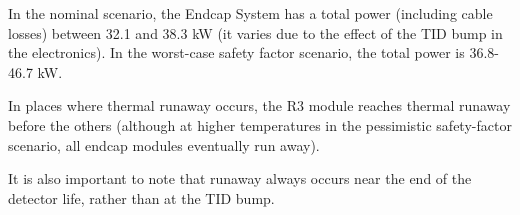 In the nominal scenario, the Endcap System has a total power (including cable losses) between 32.1
and 38.3 kW (it varies due to the effect of the TID bump in the electronics).
In the worst-case safety factor scenario, the total power is 36.8-46.7 kW.

In places where thermal runaway occurs, the R3 module reaches thermal runaway before the others
(although at higher temperatures in the pessimistic safety-factor scenario, all endcap modules
eventually run away).

It is also important to note that runaway always occurs near the end of the detector life, rather than
at the TID bump.

\let\arraystretcha\arraystretch
\renewcommand\arraystretch{1.15} %

\begin{table}[ht]
\begin{subtable}[t]{.99\linewidth}
\begin{centering}
\end{centering}
\end{subtable}
\end{table}
